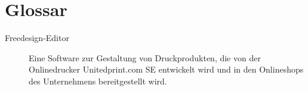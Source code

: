 \chapter*{Glossar}
\begin{description}
    \item[Freedesign-Editor] Eine Software zur Gestaltung von Druckprodukten, die von der Onlinedrucker Unitedprint.com SE entwickelt wird und in den Onlineshops des Unternehmens bereitgestellt wird.

\end{description}
